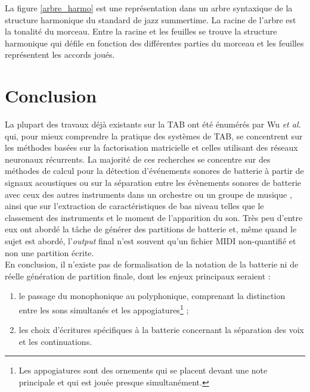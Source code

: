 La figure \ref{arbre_harmo} est une représentation dans un arbre syntaxique de
la structure harmonique du standard de jazz summertime. La racine de l’arbre
est la tonalité du morceau. Entre la racine et les feuilles se trouve la
structure harmonique qui défile en fonction des différentes parties du morceau
et les feuilles représentent les accords joués.

\section*{Conclusion}
La plupart des travaux déjà existants sur la TAB ont été énumérés par Wu
\textit{et al.} \cite{Review_ADT} qui, pour mieux comprendre la pratique des
systèmes de TAB, se concentrent sur les méthodes basées sur la factorisation
matricielle et celles utilisant des réseaux neuronaux récurrents. La majorité
de ces recherches se concentre sur des méthodes de calcul pour la détection
d'événements sonores de batterie à partir de signaux acoustiques ou sur la
séparation entre les évènements sonores de batterie avec ceux des autres
instruments dans un orchestre ou un groupe de musique \cite{2802}, ainsi que
sur l'extraction de caractéristiques de bas niveau telles que le classement des
instruments et le moment de l'apparition du son. Très peu d'entre eux ont
abordé la tâche de générer des partitions de batterie et, même quand le sujet
est abordé, l’\textit{output} final n’est souvent qu’un fichier MIDI
non-quantifié et non une partition écrite.\\

En conclusion, il n’existe pas de formalisation de la notation de la batterie
ni de réelle génération de partition finale, dont les enjeux principaux
seraient :
\begin{enumerate}
    \item le passage du monophonique au polyphonique, comprenant la distinction
        entre les sons simultanés et les appogiatures\footnote{Les appogiatures
        sont des ornements qui se placent devant une note principale et qui est
    jouée presque simultanément.} ;
    \item les choix d’écritures spécifiques à la batterie concernant la
        séparation des voix et les continuations.
\end{enumerate}
